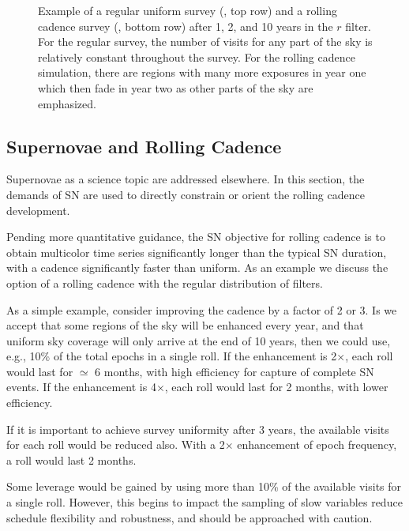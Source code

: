 \begin{figure}
  \caption{Example of a regular uniform survey
  (, top row) and a rolling
  cadence survey (, bottom row)
  after 1, 2, and 10 years in the $r$ filter.
  For the regular survey, the number of visits for any part of the sky
  is relatively constant throughout the survey.  For the rolling cadence
  simulation, there are regions with many more exposures in year one
  which then fade in year two as other parts of the sky are
  emphasized.}
  \label{fig:rollingcadence}
\end{figure}



\subsection{Supernovae and Rolling Cadence}
\label{sec:rolling:supernovae}

Supernovae as a science topic are addressed elsewhere.
In this section, the demands of SN are used to directly constrain or
orient the rolling cadence development.

Pending more quantitative guidance, the SN objective for rolling cadence
is to obtain multicolor time series significantly longer than the
typical SN duration, with a cadence significantly faster than uniform.
As an example we discuss the option of a rolling cadence with the
regular distribution of filters.

As a simple example, consider improving the cadence by a factor of 2 or
3.  Is we accept that some regions of the sky will be enhanced every
year, and that uniform sky coverage will only arrive at the end of 10
years, then we could use, e.g., 10\% of the total epochs in a single
roll.  If the enhancement is 2$\times$, each roll would last for
$\simeq$ 6 months, with high efficiency for capture of complete SN
events.  If the enhancement is 4$\times$, each roll would last for 2
months, with lower efficiency.

If it is important to achieve survey uniformity after 3 years, the
available visits for each roll would be reduced also.  With a 2$\times$
enhancement of epoch frequency, a roll would last 2 months.

Some leverage would be gained by using more than 10\% of the available
visits for a single roll.  However, this begins to impact the sampling
of slow variables reduce schedule flexibility and robustness, and should
be approached with caution.

